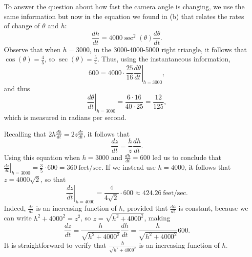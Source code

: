 \begin{activitySolution}
	To answer the question about how fast the camera angle is changing, we use the same information but now in the equation we found in (b) that relates the rates of change of $\theta$ and $h$:
	$$\frac{dh}{dt} = 4000 \sec^2 (\theta) \frac{d\theta}{dt}.$$
	Observe that when $h = 3000$, in the 3000-4000-5000 right triangle, it follows that $\cos(\theta) = \frac{4}{5}$, so $\sec(\theta) = \frac{5}{4}$.  Thus, using the instantaneous information,
	$$600 = 4000 \cdot \frac{25}{16} \left. \frac{d\theta}{dt} \right|_{h=3000},$$
	and thus
	$$ \left. \frac{d\theta}{dt} \right|_{h=3000} = \frac{6 \cdot 16}{40 \cdot 25} = \frac{12}{125},$$
	which is measured in radians per second.
	\item Recalling that $2h \frac{dh}{dt} = 2z \frac{dz}{dt}$, it follows that 
	$$\frac{dz}{dt} = \frac{h}{z} \frac{dh}{dt}.$$
	Using this equation when $h = 3000$ and $\frac{dh}{dt} = 600$ led us to conclude that $\left. \frac{dz}{dt} \right|_{h=3000} = \frac{3}{5} \cdot 600 = 360 \ \mbox{feet/sec}$.  If we instead use $h = 4000$, it follows that $z = 4000\sqrt{2}$, so that
	$$\left. \frac{dz}{dt} \right|_{h=4000} = \frac{4}{4\sqrt{2}} \cdot 600 \approx 424.26 \ \mbox{feet/sec}.$$
	Indeed, $\frac{dz}{dt}$ is an increasing function of $h$, provided that $\frac{dh}{dt}$ is constant, because we can write $h^2 + 4000^2 = z^2$, so $z = \sqrt{h^2 + 4000^2}$, making
	$$\frac{dz}{dt} = \frac{h}{\sqrt{h^2 + 4000^2}} \frac{dh}{dt} = \frac{h}{\sqrt{h^2 + 4000^2}} 600.$$
	It is straightforward to verify that $\frac{h}{\sqrt{h^2 + 4000^2}}$ is an increasing function of $h$.
\ea
\end{activitySolution}
\aftera





